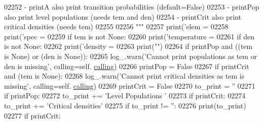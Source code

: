 \begin{DoxyCode}
02252 \textcolor{stringliteral}{            - printA       also print transition probabilities (default=False)}
02253 \textcolor{stringliteral}{            - printPop     also print level populations (needs tem and den)}
02254 \textcolor{stringliteral}{            - printCrit    also print critical densities (needs tem)}
02255 \textcolor{stringliteral}{}
02256 \textcolor{stringliteral}{        """}
02257         print(\textcolor{stringliteral}{'elem = %
02258         print(\textcolor{stringliteral}{'spec = %
02259         \textcolor{keywordflow}{if} tem \textcolor{keywordflow}{is} \textcolor{keywordflow}{not} \textcolor{keywordtype}{None}:
02260             print(\textcolor{stringliteral}{'temperature = %
02261         \textcolor{keywordflow}{if} den \textcolor{keywordflow}{is} \textcolor{keywordflow}{not} \textcolor{keywordtype}{None}:
02262             print(\textcolor{stringliteral}{'density = %
02263         print(\textcolor{stringliteral}{""})
02264         \textcolor{keywordflow}{if} printPop \textcolor{keywordflow}{and} ((tem \textcolor{keywordflow}{is} \textcolor{keywordtype}{None}) \textcolor{keywordflow}{or} (den \textcolor{keywordflow}{is} \textcolor{keywordtype}{None})):
02265             log\_.warn(\textcolor{stringliteral}{'Cannot print populations as tem or den is missing'}, calling=self.
      \hyperlink{classpyneb_1_1core_1_1pynebcore_1_1_atom_a373b7735acf4f528b54bddf373ad67a1}{calling})
02266             printPop = \textcolor{keyword}{False}
02267         \textcolor{keywordflow}{if} printCrit \textcolor{keywordflow}{and} (tem \textcolor{keywordflow}{is} \textcolor{keywordtype}{None}):
02268             log\_.warn(\textcolor{stringliteral}{'Cannot print critical densities as tem is missing'}, calling=self.
      \hyperlink{classpyneb_1_1core_1_1pynebcore_1_1_atom_a373b7735acf4f528b54bddf373ad67a1}{calling})
02269             printCrit = \textcolor{keyword}{False}
02270         to\_print = \textcolor{stringliteral}{''}
02271         \textcolor{keywordflow}{if} printPop:
02272             to\_print += \textcolor{stringliteral}{'Level   Populations  '}
02273         \textcolor{keywordflow}{if} printCrit:
02274             to\_print += \textcolor{stringliteral}{'Critical densities'}
02275         \textcolor{keywordflow}{if} to\_print != \textcolor{stringliteral}{''}:
02276             print(to\_print)
02277         \textcolor{keywordflow}{if} printCrit:
}}}}
\end{DoxyCode}
